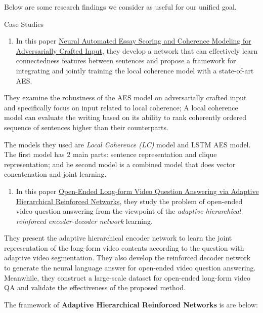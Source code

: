 \documentclass{acm_proc_article-sp}
\providecommand{\tightlist}{%
  \setlength{\itemsep}{0pt}\setlength{\parskip}{0pt}}
\begin{document}
Below are some research findings we consider as useful for our unified
goal.

Case Studies

\begin{enumerate}
\def\labelenumi{\arabic{enumi}.}
\tightlist
\item
  In this paper \href{http://aclweb.org/anthology/N18-1024}{Neural
  Automated Essay Scoring and Coherence Modeling for Adversarially
  Crafted Input}, they develop a network that can effectively learn
  connectedness features between sentences and propose a framework for
  integrating and jointly training the local coherence model with a
  state-of-art AES.
\end{enumerate}

They examine the robustness of the AES model on adversarially crafted
input and specifically focus on input related to local coherence; A
local coherence model can evaluate the writing based on its ability to
rank coherently ordered sequence of sentences higher than their
counterparts.

The models they used are \emph{Local Coherence (LC)} model and LSTM AES
model. The first model has 2 main parts: sentence representation and
clique representation; and he second model is a combined model that does
vector concatenation and joint learning.

\begin{enumerate}
\def\labelenumi{\arabic{enumi}.}
\setcounter{enumi}{1}
\tightlist
\item
  In this paper
  \href{https://www.ijcai.org/proceedings/2018/0512.pdf}{Open-Ended
  Long-form Video Question Answering via Adaptive Hierarchical
  Reinforced Networks}, they study the problem of open-ended video
  question answering from the viewpoint of the \emph{adaptive
  hierarchical reinforced encoder-decoder network} learning.
\end{enumerate}

They present the adaptive hierarchical encoder network to learn the
joint representation of the long-form video contents according to the
question with adaptive video segmentation. They also develop the
reinforced decoder network to generate the neural language answer for
open-ended video question answering. Meanwhile, they construct a
large-scale dataset for open-ended long-form video QA and validate the
effectiveness of the proposed method.

The framework of \textbf{Adaptive Hierarchical Reinforced Networks} is
are below:
\end{document}
